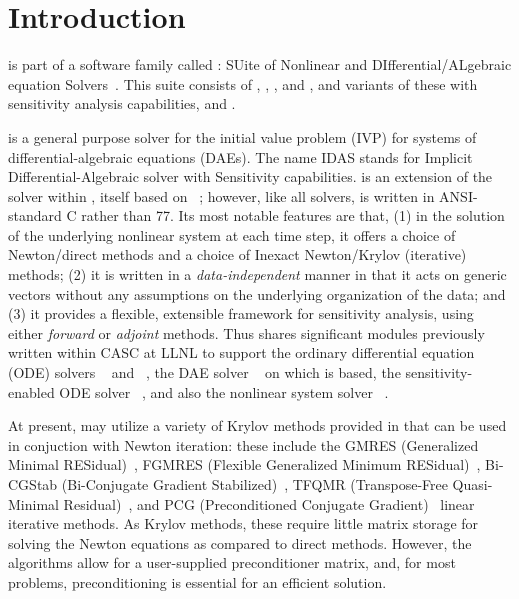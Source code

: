 \chapter{Introduction}\label{s:intro}

{\idas} is part of a software family called {\sundials}: 
SUite of Nonlinear and DIfferential/ALgebraic equation Solvers~\cite{HBGLSSW:05}. 
This suite consists of {\cvode}, {\arkode}, {\kinsol}, and {\ida}, and variants
of these with sensitivity analysis capabilities, {\cvodes} and {\idas}.

{\idas} is a general purpose solver for the initial value problem (IVP) for
systems of differential-algebraic equations (DAEs).  The name IDAS
stands for Implicit Differential-Algebraic solver with Sensitivity capabilities.
{\idas} is an extension of the {\ida} solver within {\sundials}, itself 
based on {\daspk}~\cite{BHP:94,BHP:98}; however, like all {\sundials} solvers,
{\idas} is written in ANSI-standard C rather than {\F}77.  
Its most notable features are that, 
(1) in the solution of the underlying nonlinear system at each time step, it 
offers a choice of Newton/direct methods and a choice of Inexact Newton/Krylov
(iterative) methods;
(2) it is written in a {\em data-independent} manner in that it acts
on generic vectors without any assumptions on the underlying organization
of the data; and
(3) it provides a flexible, extensible framework for sensitivity analysis,
using either {\em forward} or {\em adjoint} methods.
Thus {\idas} shares significant modules previously written within CASC
at LLNL to support the ordinary differential equation (ODE) solvers
{\cvode}~\cite{cvode_ug,CoHi:96} and {\pvode}~\cite{ByHi:98,ByHi:99},
the DAE solver {\ida}~\cite{ida_ug} on which {\idas} is based, the
sensitivity-enabled ODE solver {\cvodes}~\cite{cvodes_ug,SeHi:05}, and
also the nonlinear system solver {\kinsol}~\cite{kinsol_ug}.

At present, {\idas} may utilize a variety of Krylov methods provided
in {\sundials} that can be used in conjuction with Newton iteration:
these include the GMRES (Generalized Minimal RESidual)~\cite{SaSc:86},
FGMRES (Flexible Generalized Minimum RESidual)~\cite{Saa:93},
Bi-CGStab (Bi-Conjugate Gradient Stabilized)~\cite{Van:92}, TFQMR
(Transpose-Free Quasi-Minimal Residual)~\cite{Fre:93}, and PCG
(Preconditioned Conjugate Gradient)~\cite{HeSt:52} linear iterative
methods.  As Krylov methods, these require little  
matrix storage for solving the Newton equations as compared to direct 
methods. However, the algorithms allow for a user-supplied preconditioner
matrix, and, for most problems, preconditioning is essential for an
efficient solution.

